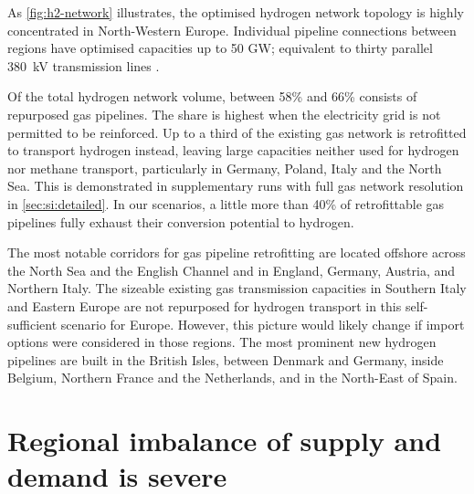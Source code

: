 
As \cref{fig:h2-network} illustrates, the optimised hydrogen network topology is
highly concentrated in North-Western Europe. Individual pipeline connections
between regions have optimised capacities up to 50 GW; equivalent to thirty
parallel 380~kV transmission lines \cite{}.

Of the total hydrogen network volume, between 58\% and 66\% consists of
repurposed gas pipelines. The share is highest when the electricity grid is not
permitted to be reinforced. Up to a third of the existing gas network is
retrofitted to transport hydrogen instead, leaving large capacities neither used
for hydrogen nor methane transport, particularly in Germany, Poland, Italy and
the North Sea. This is demonstrated in supplementary runs with full gas network
resolution in \cref{sec:si:detailed}. In our scenarios, a little more than 40\%
of retrofittable gas pipelines fully exhaust their conversion potential to
hydrogen.

The most notable corridors for gas pipeline retrofitting are located offshore
across the North Sea and the English Channel and in England, Germany, Austria,
and Northern Italy. The sizeable existing gas transmission capacities in
Southern Italy and Eastern Europe are not repurposed for hydrogen transport in
this self-sufficient scenario for Europe. However, this picture would likely
change if import options were considered in those regions. The most prominent
new hydrogen pipelines are built in the British Isles, between Denmark and
Germany, inside Belgium, Northern France and the Netherlands, and in the
North-East of Spain.


\section*{Regional imbalance of supply and demand is severe}
\label{sec:imbalance}

